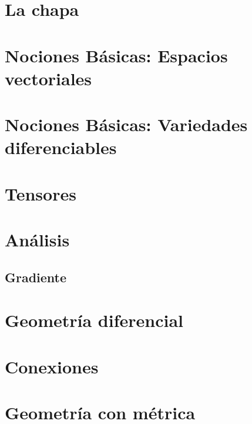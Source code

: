 \documentclass[11pt,fleqn]{book}
\begin{document}
  \printglossaries


  \chapter{La chapa}\label{ch:la-chapa}
  


  \chapter{Nociones Básicas: Espacios vectoriales}\label{ch:basico-espacio-vectorial}
  


  \chapter{Nociones Básicas: Variedades diferenciables}\label{ch:basico-variedad-diferencial}
  


  \chapter{Tensores}\label{ch:tensores}
  


  \chapter{Análisis}\label{ch:analisis}


  \section{Gradiente}\label{sec:gradiente}
  


  \chapter{Geometría diferencial}\label{ch:geometria-diferencial}
  


  \chapter{Conexiones}\label{ch:conexiones}
  

  \chapter{Geometría con métrica}\label{ch:geometría-metrica}
  

  
  
  
\end{document}
